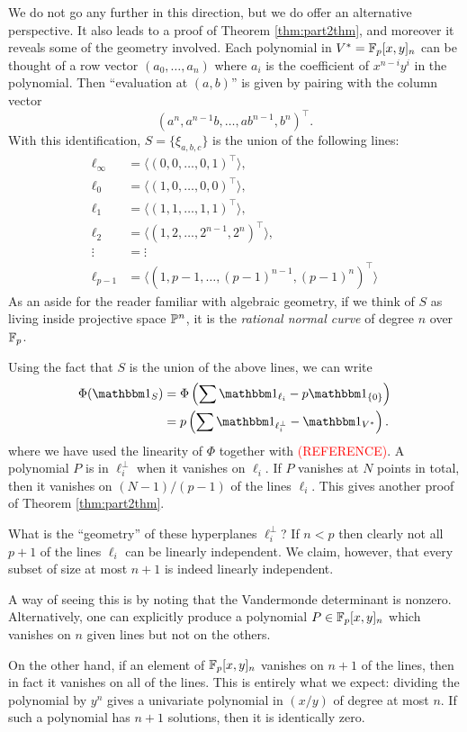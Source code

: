 We do not go any further in this direction, but we do offer an alternative perspective. It also leads to a proof of Theorem \ref{thm:part2thm}, and moreover it reveals some of the geometry involved. Each polynomial in $V^* = \F_p[x,y]_n$ can be thought of a row vector $(a_0,\ldots,a_n)$ where $a_i$ is the coefficient of $x^{n-i}y^i$ in the polynomial. Then ``evaluation at $(a,b)$'' is given by pairing with the column vector
\[
	(a^n,a^{n-1}b,\ldots,ab^{n-1},b^n)^\top.
\]
With this identification, $S = \{\xi_{a,b,c}\}$ is the union of the following lines:
\begin{align*}
	\ell_\infty &= \langle (0,0,\ldots,0,1)^\top \rangle,\\
	\ell_0 &= \langle (1,0,\ldots,0,0)^\top \rangle,\\
	\ell_1 &= \langle (1,1,\ldots,1,1)^\top \rangle,\\
	\ell_2 &= \langle (1,2,\ldots,2^{n-1},2^n)^\top \rangle,\\
	\vdots &= \vdots\\
	\ell_{p-1} &= \langle (1,p-1,\ldots,(p-1)^{n-1},(p-1)^n)^\top \rangle
\end{align*}
As an aside for the reader familiar with algebraic geometry, if we think of $S$ as living inside projective space $\P^{n}$, it is the \emph{rational normal curve} of degree $n$ over $\F_p$.

Using the fact that $S$ is the union of the above lines, we can write
\begin{align*}
	\Phi(\IND_S) &= \Phi\left( \sum \IND_{\ell_i} - p\IND_{\{0\}} \right)\\
	&= p\left(\sum \IND_{\ell_i^\bot} - \IND_{V^*}\right).
\end{align*}
where we have used the linearity of $\Phi$ together with \textcolor{red}{(REFERENCE)}. A polynomial $P$ is in $\ell_i^\bot$ when it vanishes on $\ell_i$. If $P$ vanishes at $N$ points in total, then it vanishes on $(N - 1)/(p-1)$ of the lines $\ell_i$. This gives another proof of Theorem \ref{thm:part2thm}.

What is the ``geometry'' of these hyperplanes $\ell_i^\bot$? If $n < p$ then clearly not all $p+1$ of the lines $\ell_i$ can be linearly independent. We claim, however, that every subset of size at most $n+1$ is indeed linearly independent.

A way of seeing this is by noting that the Vandermonde determinant is nonzero. Alternatively, one can explicitly produce a polynomial $P \in \F_p[x,y]_n$ which vanishes on $n$ given lines but not on the others.

On the other hand, if an element of $\F_p[x,y]_n$ vanishes on $n+1$ of the lines, then in fact it vanishes on all of the lines. This is entirely what we expect: dividing the polynomial by $y^n$ gives a univariate polynomial in $(x/y)$ of degree at most $n$. If such a polynomial has $n+1$ solutions, then it is identically zero.